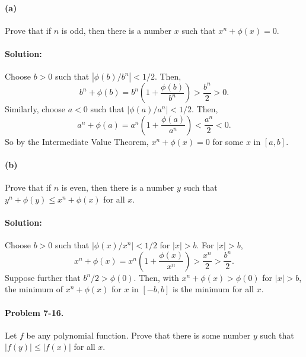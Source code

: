 \documentclass{article}
\begin{document}
\paragraph{(a)} Prove that if $n$ is odd, then there is a number $x$ such that
$x^n + \phi(x) = 0$.

\paragraph{Solution:} Choose $b > 0$ such that $|\phi(b)/b^n| < 1/2$. Then,
\begin{equation*}
  b^n + \phi(b) = b^n\left(1 + \frac{\phi(b)}{b^n}\right) > \frac{b^n}{2} > 0.
\end{equation*}
Similarly, choose $a < 0$ such that $|\phi(a)/a^n| < 1/2$. Then,
\begin{equation*}
  a^n + \phi(a) = a^n\left(1 + \frac{\phi(a)}{a^n}\right) < \frac{a^n}{2} < 0.
\end{equation*}
So by the Intermediate Value Theorem, $x^n + \phi(x) = 0$ for some $x$ in $[a,
b]$.

\paragraph{(b)} Prove that if $n$ is even, then there is a number $y$ such that
$y^n + \phi(y) \leq x^n + \phi(x)$ for all $x$.

\paragraph{Solution:} Choose $b > 0$ such that $|\phi(x)/x^n| < 1/2$ for $|x| >
b$. For $|x| > b$, \begin{equation*}
  x^n + \phi(x) = x^n\left(1 + \frac{\phi(x)}{x^n}\right) > \frac{x^n}{2} >
    \frac{b^n}{2}.
\end{equation*}
Suppose further that $b^n/2 > \phi(0)$. Then, with $x^n + \phi(x) > \phi(0)$
for $|x| > b$, the minimum of $x^n + \phi(x)$ for $x$ in $[-b, b]$ is the
minimum for all $x$.

\paragraph{Problem 7-16.} Let $f$ be any polynomial function. Prove that there
is some number $y$ such that $|f(y)| \leq |f(x)|$ for all $x$.
\end{document}
